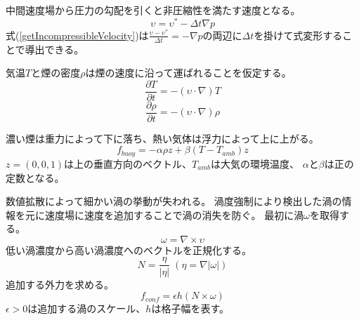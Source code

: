\documentclass{ujarticle}
\begin{document}
中間速度場から圧力の勾配を引くと非圧縮性を満たす速度となる。
\begin{equation}
\label{getIncompressibleVelocity}
\upsilon = \upsilon^* - \Delta t \nabla p
\end{equation}
式(\ref{getIncompressibleVelocity})は$\frac{\upsilon - \upsilon^* }{\Delta t} = - \nabla p$の両辺に$\Delta t$を掛けて式変形することで導出できる。

気温$T$と煙の密度$\rho$は煙の速度に沿って運ばれることを仮定する。
\begin{equation}
\label{temperature}
\frac{\partial T}{\partial t} = - ( \upsilon \cdot \nabla)T
\end{equation}
\begin{equation}
\label{dencity}
\frac{\partial \rho}{\partial t} = - ( \upsilon \cdot \nabla)\rho
\end{equation}

濃い煙は重力によって下に落ち、熱い気体は浮力によって上に上がる。
\begin{equation}
\label{buoyancy}
f_{buoy}=-\alpha\rho z + \beta(T-T_{amb}) z
\end{equation} 
$z=(0,0,1)$は上の垂直方向のベクトル、$T_{amb}$は大気の環境温度、
$\alpha$と$\beta$は正の定数となる。

数値拡散によって細かい渦の挙動が失われる。
渦度強制により検出した渦の情報を元に速度場に速度を追加することで渦の消失を防ぐ。
最初に渦$\omega$を取得する。
\begin{equation}
\label{volticity}
\omega=\nabla \times \upsilon
\end{equation}
低い渦濃度から高い渦濃度へのベクトルを正規化する。
\begin{equation}
\label{normalizeVelocityLocation}
N=\frac{\eta}{|\eta|}\;(\eta=\nabla|\omega|)
\end{equation}
追加する外力を求める。
\begin{equation}
\label{confinementForce}
f_{conf}=\epsilon h (N \times \omega)
\end{equation}
$\epsilon > 0$は追加する渦のスケール、$h$は格子幅を表す。
\end{document}
